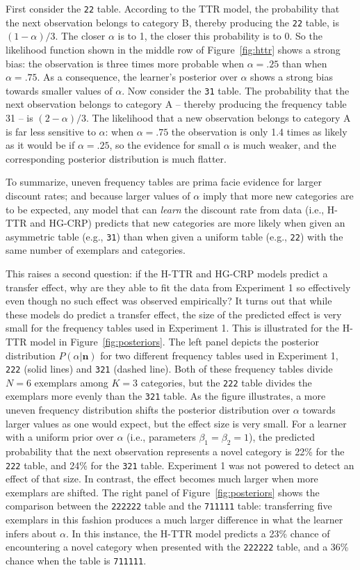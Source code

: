 \documentclass[doc]{apa6}
\newcommand{\dist}[1]{\texttt{#1}}
\begin{document}
First consider the \dist{22} table. According to the TTR model, the probability that the next observation belongs to category B, thereby producing the \dist{22} table, is $(1-\alpha)/3$. The closer $\alpha$ is to 1, the closer this probability is to 0. So the likelihood function shown in the middle row of Figure~\ref{fig:httr} shows a strong bias: the observation is three times more probable when $\alpha = .25$ than when $\alpha = .75$. As a consequence, the learner's posterior over $\alpha$ shows a strong bias towards smaller values of $\alpha$. Now consider the \dist{31} table. The probability that the next observation belongs to category A -- thereby producing the frequency table 31 -- is $(2-\alpha)/3$. The likelihood that a new observation belongs to category A is far less sensitive to $\alpha$: when $\alpha = .75$ the observation is only 1.4 times as likely as it would be if $\alpha=.25$, so the evidence for small $\alpha$ is much weaker, and the corresponding posterior distribution is much flatter.

To summarize, uneven frequency tables are prima facie evidence for larger discount rates; and because larger values of $\alpha$ imply that more new categories are to be expected, any model that can {\it learn} the discount rate from data (i.e., H-TTR and HG-CRP) predicts that new categories are more likely when given an asymmetric table (e.g., \dist{31}) than when given a uniform table (e.g., \dist{22}) with the same number of exemplars and categories.


This raises a second question: if the H-TTR and HG-CRP models predict a transfer effect, why are they able to fit the data from Experiment 1 so effectively even though no such effect was observed empirically? It turns out that while these models do predict a transfer effect, the size of the predicted effect is very small for the frequency tables used in Experiment 1. This is illustrated for the H-TTR model in Figure~\ref{fig:posteriors}. The left panel depicts the posterior distribution $P(\alpha | \bm{n})$ for two different frequency tables used in Experiment 1, \dist{222} (solid lines) and \dist{321} (dashed line). Both of these frequency tables divide $N=6$ exemplars among $K=3$ categories, but the \dist{222} table divides the exemplars more evenly than the \dist{321} table. As the figure illustrates, a more uneven frequency distribution shifts the posterior distribution over $\alpha$ towards larger values as one would expect, but the effect size is very small. For a learner with a uniform prior over $\alpha$ (i.e., parameters $\beta_1 = \beta_2 = 1$), the predicted probability that the next observation represents a novel category is 22\% for the \dist{222} table, and 24\% for the \dist{321} table. Experiment 1 was not powered to detect an effect of that size. In contrast, the effect becomes much larger when more exemplars are shifted. The right panel of Figure~\ref{fig:posteriors} shows the comparison between the \dist{222222} table and the \dist{711111} table: transferring five exemplars in this fashion produces a much larger difference in what the learner infers about $\alpha$. In this instance, the H-TTR model predicts a 23\% chance of encountering a novel category when presented with the \dist{222222} table, and a 36\% chance when the table is \dist{711111}.
\end{document}
